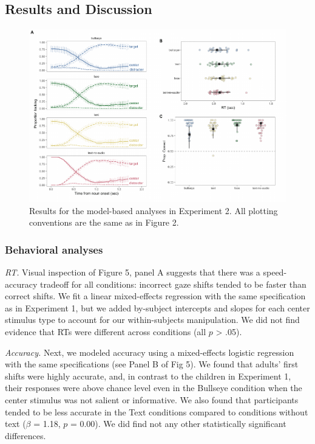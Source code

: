 \documentclass[english,floatsintext,man]{apa6}
\theoremstyle{definition}
\theoremstyle{definition}
\theoremstyle{definition}
\theoremstyle{remark}
\begin{document}
\hypertarget{results-and-discussion-1}{%
\subsection{Results and Discussion}\label{results-and-discussion-1}}

\begin{figure}[tb]

{\centering \includegraphics[width=0.85\linewidth]{figs/text-plot-1} 

}

\caption{Results for the model-based analyses in Experiment 2. All plotting conventions are the same as in Figure 2.}\label{fig:text-plot}
\end{figure}

\hypertarget{behavioral-analyses-1}{%
\subsubsection{Behavioral analyses}\label{behavioral-analyses-1}}

\emph{RT.} Visual inspection of Figure 5, panel A suggests that there
was a speed-accuracy tradeoff for all conditions: incorrect gaze shifts
tended to be faster than correct shifts. We fit a linear mixed-effects
regression with the same specification as in Experiment 1, but we added
by-subject intercepts and slopes for each center stimulus type to
account for our within-subjects manipulation. We did not find evidence
that RTs were different across conditions (all \(p\) \textgreater{}
.05).

\emph{Accuracy.} Next, we modeled accuracy using a mixed-effects
logistic regression with the same specifications (see Panel B of Fig 5).
We found that adults' first shifts were highly accurate, and, in
contrast to the children in Experiment 1, their responses were above
chance level even in the Bullseye condition when the center stimulus was
not salient or informative. We also found that participants tended to be
less accurate in the Text conditions compared to conditions without text
(\(\beta\) = 1.18, \(p\) = 0.00). We did find not any other
statistically significant differences.
\end{document}
